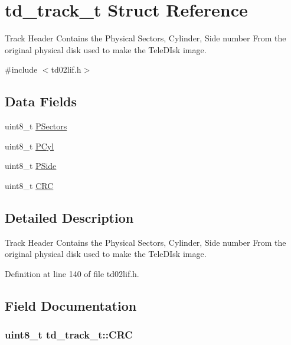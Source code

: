 \hypertarget{structtd__track__t}{}\section{td\+\_\+track\+\_\+t Struct Reference}
\label{structtd__track__t}


Track Header Contains the Physical Sectors, Cylinder, Side number From the original physical disk used to make the Tele\+D\+Isk image.  




{\ttfamily \#include $<$td02lif.\+h$>$}

\subsection*{Data Fields}
\begin{DoxyCompactItemize}
\item 
uint8\+\_\+t \hyperlink{structtd__track__t_a8f8ba7a0392f869f062f46d50a11bdfa}{P\+Sectors}
\item 
uint8\+\_\+t \hyperlink{structtd__track__t_a479a4bf60fcfdcbca513ebdea33b8e8c}{P\+Cyl}
\item 
uint8\+\_\+t \hyperlink{structtd__track__t_af2074402835d514cbf7f5f40e25fa284}{P\+Side}
\item 
uint8\+\_\+t \hyperlink{structtd__track__t_a32523d00c555ab3bc766a585d06ce372}{C\+RC}
\end{DoxyCompactItemize}


\subsection{Detailed Description}
Track Header Contains the Physical Sectors, Cylinder, Side number From the original physical disk used to make the Tele\+D\+Isk image. 

Definition at line 140 of file td02lif.\+h.



\subsection{Field Documentation}
\subsubsection[{\texorpdfstring{C\+RC}{CRC}}]{\setlength{\rightskip}{0pt plus 5cm}uint8\+\_\+t td\+\_\+track\+\_\+t\+::\+C\+RC}\hypertarget{structtd__track__t_a32523d00c555ab3bc766a585d06ce372}{}\label{structtd__track__t_a32523d00c555ab3bc766a585d06ce372}


